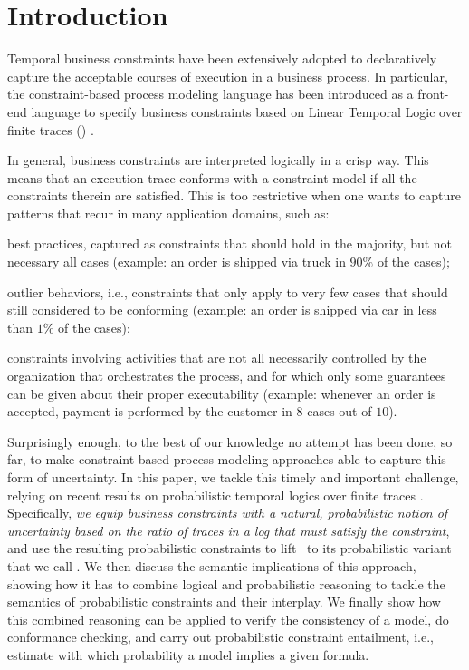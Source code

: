 \section{Introduction}
\label{introduction}

Temporal business constraints have been extensively adopted to declaratively capture the acceptable courses of execution in a business process. In particular, the \emph{\declare} constraint-based process modeling language \cite{PeSV07} has been introduced as a front-end language to specify business constraints based on Linear Temporal Logic over finite traces (\LTLf) \cite{DeVa13}.

In general, business constraints are interpreted logically in a crisp way.
 This means that an execution trace conforms with a constraint model if all the constraints therein are satisfied. This is too restrictive when one wants to capture patterns that recur in many application domains, such as:
 \begin{compactitem}[$\bullet$]
 \item best practices, captured as constraints that should hold in the majority, but not necessary all cases (example: an order is shipped via truck in $90\%$ of the cases);
 \item outlier behaviors, i.e., constraints that only apply to very few cases that should still considered to be conforming (example: an order is shipped via car in less than $1\%$ of the cases);
 \item constraints involving activities that are not all necessarily controlled by the organization that orchestrates the process, and for which only some guarantees can be given about their proper executability (example: whenever an order is accepted, payment is performed by the customer in $8$ cases out of $10$).
 \end{compactitem}

Surprisingly enough, to the best of our knowledge no attempt has been done, so far, to make constraint-based process modeling approaches able to capture this form of uncertainty. In this paper, we tackle this timely and important challenge, relying on recent results on probabilistic temporal logics over finite traces \cite{MaMP20}. Specifically, \emph{we equip business constraints with a natural, probabilistic notion of uncertainty based on the ratio of traces in a log that must satisfy the constraint}, and use the resulting probabilistic constraints to lift \declare\ to its probabilistic variant that we call \pdeclare.
We then discuss the semantic implications of this approach, showing how it has to combine logical and probabilistic reasoning to tackle the semantics of probabilistic constraints and their interplay.
We finally show how this combined reasoning can be applied to verify the consistency of a \pdeclare model, do conformance checking, and carry out probabilistic constraint entailment, i.e., estimate with which probability a \pdeclare model implies a given \LTLf formula.


